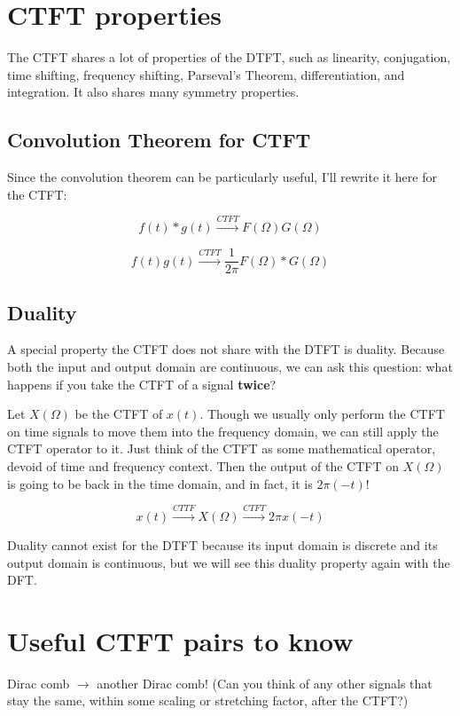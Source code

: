 \documentclass[11pt]{article}
\begin{document}
\section{CTFT properties}

The CTFT shares a lot of properties of the DTFT, such as linearity, conjugation, time shifting, frequency shifting, Parseval's Theorem, differentiation, and integration. It also shares many symmetry properties. 

\subsection*{Convolution Theorem for CTFT}
Since the convolution theorem can be particularly useful, I'll rewrite it here for the CTFT:

\[
f(t) * g(t) \stackrel{CTFT}{\rightarrow } F(\Omega) G(\Omega) 
\]

\[
f(t)g(t) \stackrel{CTFT}{\rightarrow} \frac{1}{2\pi} F(\Omega) * G(\Omega)
\]

\subsection*{Duality}
A special property the CTFT does not share with the DTFT is duality. Because both the input and output domain are continuous, we can ask this question: what happens if you take the CTFT of a signal \textbf{twice}?

Let $X(\Omega)$ be the CTFT of $x(t)$. Though we usually only perform the CTFT on time signals to move them into the frequency domain, we can still apply the CTFT operator to it. Just think of the CTFT as some mathematical operator, devoid of time and frequency context. Then the output of the CTFT on $X(\Omega)$ is going to be back in the time domain, and in fact, it is $2\pi(-t)$!

\[ x(t) \stackrel{CTTF}{\rightarrow} X(\Omega) \stackrel{CTFT}{\rightarrow} 2\pi x(-t)
\]

Duality cannot exist for the DTFT because its input domain is discrete and its output domain is continuous, but we will see this duality property again with the DFT.

\section{Useful CTFT pairs to know}

Dirac comb $\rightarrow$ another Dirac comb! (Can you think of any other signals that stay the same, within some scaling or stretching factor, after the CTFT?)
\end{document}
